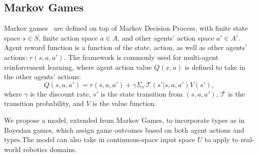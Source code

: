 \documentclass[letterpaper, 10 pt, conference]{ieeeconf}  %
\begin{document}


\vspace{-.2em}
\subsection{Markov Games}
\vspace{-.2em}
Markov games~\cite{littman1994markov} are defined on top of Markov Decision Process, with finite state space 
$s \in S$, finite action space $a \in A$, and other agents' action space 
$a' \in A'$.  Agent reward 
function is a function of the state, action, as well as other agents' actions: 
$r(s,a,a')$. The framework is commonly used for multi-agent reinforcement 
learning, where agent action value $Q(x,a)$ is defined to take in the other agents' actions:
\begin{equation}
  Q(s,a,a') = r(s,a,a') + \gamma \Sigma_{s'}\mathcal{T}(s'|s,a,a')V(s'),
\end{equation}
where $\gamma$ is the discount rate, $s'$ is the state transition from 
$(s,a,a')$, $\mathcal{T}$ is the transition probability, and $V$ is the value 
function.

We propose a model, extended from Markov Games, to incorporate types as in 
Bayesian games, which assign game outcomes based on both agent actions and 
types.The model can also take in continuous-space input space $U$ to apply to real-world robotics domains. 
\end{document}
